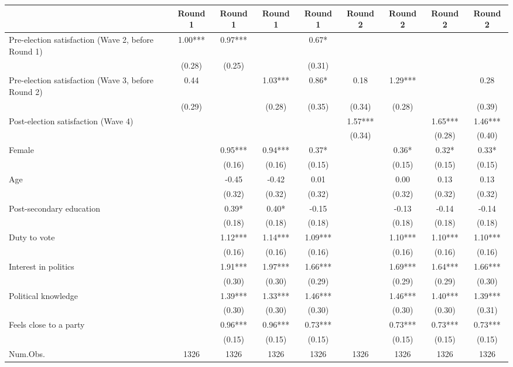 \begin{table}
\centering
\begin{tabular}[t]{lcccccccc}
\toprule
  & Round 1 & Round 1  & Round 1   & Round 1    & Round 2 & Round 2  & Round 2   & Round 2   \\
\midrule
Pre-election satisfaction (Wave 2, before Round 1) & 1.00*** & 0.97*** &  & 0.67* &  &  &  & \\
 & (0.28) & (0.25) &  & (0.31) &  &  &  & \\
Pre-election satisfaction (Wave 3, before Round 2) & 0.44 &  & 1.03*** & 0.86* & 0.18 & 1.29*** &  & 0.28\\
 & (0.29) &  & (0.28) & (0.35) & (0.34) & (0.28) &  & (0.39)\\
Post-election satisfaction (Wave 4) &  &  &  &  & 1.57*** &  & 1.65*** & 1.46***\\
 &  &  &  &  & (0.34) &  & (0.28) & (0.40)\\
Female &  & 0.95*** & 0.94*** & 0.37* &  & 0.36* & 0.32* & 0.33*\\
 &  & (0.16) & (0.16) & (0.15) &  & (0.15) & (0.15) & (0.15)\\
Age &  & -0.45 & -0.42 & 0.01 &  & 0.00 & 0.13 & 0.13\\
 &  & (0.32) & (0.32) & (0.32) &  & (0.32) & (0.32) & (0.32)\\
Post-secondary education &  & 0.39* & 0.40* & -0.15 &  & -0.13 & -0.14 & -0.14\\
 &  & (0.18) & (0.18) & (0.18) &  & (0.18) & (0.18) & (0.18)\\
Duty to vote &  & 1.12*** & 1.14*** & 1.09*** &  & 1.10*** & 1.10*** & 1.10***\\
 &  & (0.16) & (0.16) & (0.16) &  & (0.16) & (0.16) & (0.16)\\
Interest in politics &  & 1.91*** & 1.97*** & 1.66*** &  & 1.69*** & 1.64*** & 1.66***\\
 &  & (0.30) & (0.30) & (0.29) &  & (0.29) & (0.29) & (0.30)\\
Political knowledge &  & 1.39*** & 1.33*** & 1.46*** &  & 1.46*** & 1.40*** & 1.39***\\
 &  & (0.30) & (0.30) & (0.30) &  & (0.30) & (0.30) & (0.31)\\
Feels close to a party &  & 0.96*** & 0.96*** & 0.73*** &  & 0.73*** & 0.73*** & 0.73***\\
 &  & (0.15) & (0.15) & (0.15) &  & (0.15) & (0.15) & (0.15)\\
\midrule
Num.Obs. & 1326 & 1326 & 1326 & 1326 & 1326 & 1326 & 1326 & 1326\\

\end{tabular}
\end{table}
